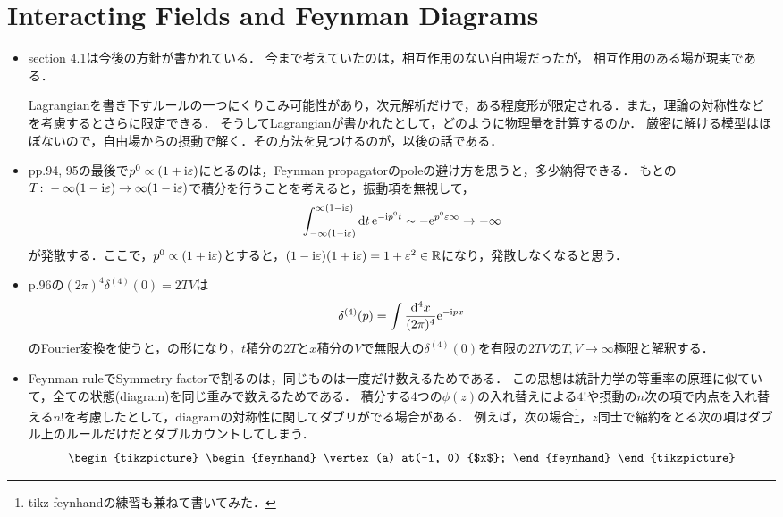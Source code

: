 \section{Interacting Fields and Feynman Diagrams}
\begin{itemize}
	\item section 4.1は今後の方針が書かれている．
		今まで考えていたのは，相互作用のない自由場だったが，
		相互作用のある場が現実である．

		Lagrangianを書き下すルールの一つにくりこみ可能性があり，次元解析だけで，ある程度形が限定される．また，理論の対称性などを考慮するとさらに限定できる．
		そうしてLagrangianが書かれたとして，どのように物理量を計算するのか．
		厳密に解ける模型はほぼないので，自由場からの摂動で解く．その方法を見つけるのが，以後の話である．
	\item pp.94, 95の最後で$p^0\propto(1+\mathrm{i}\varepsilon)$にとるのは，Feynman propagatorのpoleの避け方を思うと，多少納得できる．
		もとの$T\colon-\infty(1-\mathrm{i}\varepsilon) \to \infty(1-\mathrm{i}\varepsilon)$で積分を行うことを考えると，振動項を無視して，
		\begin{equation}
			\int_{-\infty(1-\mathrm{i}\varepsilon)}^{\infty(1-\mathrm{i}\varepsilon)}\dd{t}\mathrm{e}^{-\mathrm{i} p^0 t} \sim -\mathrm{e}^{p^0\varepsilon\infty} \to -\infty
		\end{equation}
		が発散する．ここで，$p^0\propto(1 + \mathrm{i}\varepsilon)$とすると，$(1-\mathrm{i}\varepsilon)(1+\mathrm{i}\varepsilon) = 1 + \varepsilon^2\in\mathbb{R}$になり，発散しなくなると思う．
	\item p.96の$(2\pi)^4\delta^{(4)}(0) = 2TV$は
		\begin{equation}
			\delta^{(4)}(p) = \int \frac{\dd[4]{x}}{(2\pi)^{4}}\mathrm{e}^{-\mathrm{i} px}
		\end{equation}
		のFourier変換を使うと，の形になり，$t$積分の$2T$と$x$積分の$V$で無限大の$\delta^{(4)}(0)$を有限の$2TV$の$T, V\to \infty$極限と解釈する．
	\item Feynman ruleでSymmetry factorで割るのは，同じものは一度だけ数えるためである．
		この思想は統計力学の等重率の原理に似ていて，全ての状態(diagram)を同じ重みで数えるためである．
		積分する4つの$\phi(z)$の入れ替えによる$4!$や摂動の$n$次の項で内点を入れ替える$n!$を考慮したとして，diagramの対称性に関してダブリがでる場合がある．
		例えば，次の場合\footnote{tikz-feynhandの練習も兼ねて書いてみた．}，$z$同士で縮約をとる次の項はダブル上のルールだけだとダブルカウントしてしまう．
		\begin{equation}
			\begin{tikzpicture}
				\begin{feynhand}
					\vertex  (a) at(-1, 0) {$x$};

\end{feynhand}
\end{tikzpicture}
\end{equation}
\end{itemize}
